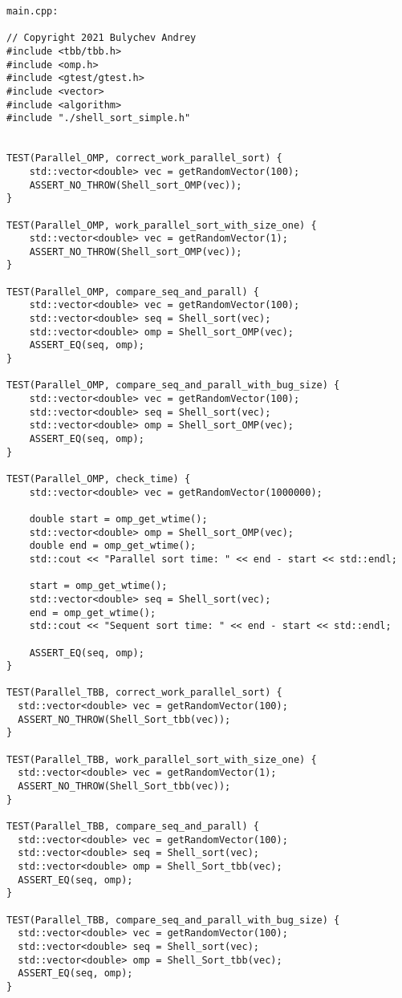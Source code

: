 \documentclass{report}
\begin{document}
\begin{lstlisting}
main.cpp:

// Copyright 2021 Bulychev Andrey
#include <tbb/tbb.h>
#include <omp.h>
#include <gtest/gtest.h>
#include <vector>
#include <algorithm>
#include "./shell_sort_simple.h"


TEST(Parallel_OMP, correct_work_parallel_sort) {
    std::vector<double> vec = getRandomVector(100);
    ASSERT_NO_THROW(Shell_sort_OMP(vec));
}

TEST(Parallel_OMP, work_parallel_sort_with_size_one) {
    std::vector<double> vec = getRandomVector(1);
    ASSERT_NO_THROW(Shell_sort_OMP(vec));
}

TEST(Parallel_OMP, compare_seq_and_parall) {
    std::vector<double> vec = getRandomVector(100);
    std::vector<double> seq = Shell_sort(vec);
    std::vector<double> omp = Shell_sort_OMP(vec);
    ASSERT_EQ(seq, omp);
}

TEST(Parallel_OMP, compare_seq_and_parall_with_bug_size) {
    std::vector<double> vec = getRandomVector(100);
    std::vector<double> seq = Shell_sort(vec);
    std::vector<double> omp = Shell_sort_OMP(vec);
    ASSERT_EQ(seq, omp);
}

TEST(Parallel_OMP, check_time) {
    std::vector<double> vec = getRandomVector(1000000);

    double start = omp_get_wtime();
    std::vector<double> omp = Shell_sort_OMP(vec);
    double end = omp_get_wtime();
    std::cout << "Parallel sort time: " << end - start << std::endl;

    start = omp_get_wtime();
    std::vector<double> seq = Shell_sort(vec);
    end = omp_get_wtime();
    std::cout << "Sequent sort time: " << end - start << std::endl;

    ASSERT_EQ(seq, omp);
}

TEST(Parallel_TBB, correct_work_parallel_sort) {
  std::vector<double> vec = getRandomVector(100);
  ASSERT_NO_THROW(Shell_Sort_tbb(vec));
}

TEST(Parallel_TBB, work_parallel_sort_with_size_one) {
  std::vector<double> vec = getRandomVector(1);
  ASSERT_NO_THROW(Shell_Sort_tbb(vec));
}

TEST(Parallel_TBB, compare_seq_and_parall) {
  std::vector<double> vec = getRandomVector(100);
  std::vector<double> seq = Shell_sort(vec);
  std::vector<double> omp = Shell_Sort_tbb(vec);
  ASSERT_EQ(seq, omp);
}

TEST(Parallel_TBB, compare_seq_and_parall_with_bug_size) {
  std::vector<double> vec = getRandomVector(100);
  std::vector<double> seq = Shell_sort(vec);
  std::vector<double> omp = Shell_Sort_tbb(vec);
  ASSERT_EQ(seq, omp);
}


\end{lstlisting}
\end{document}
